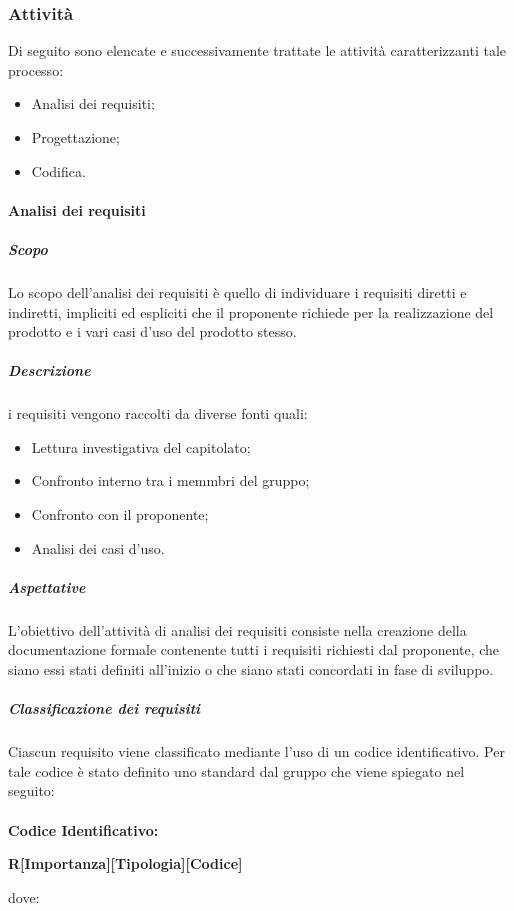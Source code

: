     \subsubsection{Attività} \label{subsubsection:Attività}
    Di seguito sono elencate e successivamente trattate le attività caratterizzanti tale processo:
    \begin{itemize}
        \item Analisi dei requisiti;
        \item Progettazione;
        \item Codifica.
    \end{itemize}
    
    \paragraph{Analisi dei requisiti} \label{paragraph:Analisi dei requisiti}
        \subparagraph{Scopo}
        Lo scopo dell’analisi dei requisiti è quello di individuare i requisiti diretti e indiretti, impliciti ed espliciti che il proponente richiede 
        per la realizzazione del prodotto e i vari casi d'uso del prodotto stesso.
    
        \subparagraph{Descrizione} \label{subparagraph:Descrizione}
        i requisiti vengono raccolti da diverse fonti quali:
       \begin{itemize}
           \item Lettura investigativa del capitolato;
           \item Confronto interno tra i memmbri del gruppo;
           \item Confronto con il proponente;
           \item Analisi dei casi d'uso.
       \end{itemize}

        \subparagraph{Aspettative} \label{subparagraph:Analisi dei requisiti}
        L’obiettivo dell’attività di analisi dei requisiti consiste nella creazione della documentazione formale contenente tutti i requisiti 
        richiesti dal proponente, che siano essi stati definiti all'inizio o che siano stati concordati in fase di sviluppo.

        \subparagraph{Classificazione dei requisiti} \label{subparagraph:Classificazione dei requisiti}
        Ciascun requisito viene classificato mediante l'uso di un codice identificativo. Per tale codice è stato definito uno standard dal gruppo che viene spiegato nel seguito:\\\\
        \textbf{Codice Identificativo:}\\
        \begin{center}
            \textbf{\LARGE{R[Importanza][Tipologia][Codice]}}
        \end{center}
        dove:

